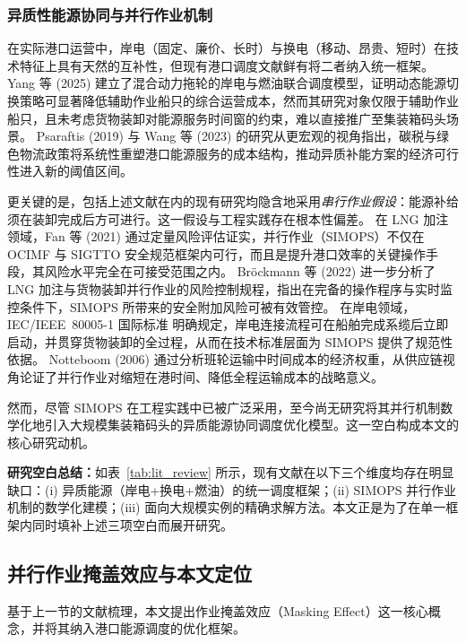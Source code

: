 \documentclass[UTF8, a4paper, 12pt]{ctexart}
\begin{document}
\subsubsection{异质性能源协同与并行作业机制}
 
在实际港口运营中，岸电（固定、廉价、长时）与换电（移动、昂贵、短时）在技术特征上具有天然的互补性，但现有港口调度文献鲜有将二者纳入统一框架。
Yang 等 (2025) \cite{Zhen2022_SP} 建立了混合动力拖轮的岸电与燃油联合调度模型，证明动态能源切换策略可显著降低辅助作业船只的综合运营成本，然而其研究对象仅限于辅助作业船只，且未考虑货物装卸对能源服务时间窗的约束，难以直接推广至集装箱码头场景。
Psaraftis (2019) \cite{Psaraftis2019} 与 Wang 等 (2023) \cite{Wang2023} 的研究从更宏观的视角指出，碳税与绿色物流政策将系统性重塑港口能源服务的成本结构，推动异质补能方案的经济可行性进入新的阈值区间。
 
更关键的是，包括上述文献在内的现有研究均隐含地采用\emph{串行作业假设}：能源补给须在装卸完成后方可进行。这一假设与工程实践存在根本性偏差。
在 LNG 加注领域，Fan 等 (2021) \cite{Fan2021} 通过定量风险评估证实，并行作业（SIMOPS）不仅在 OCIMF 与 SIGTTO 安全规范框架内可行，而且是提升港口效率的关键操作手段，其风险水平完全在可接受范围之内。
Br\"{o}ckmann 等 (2022) \cite{Fan2022_SIMOPS} 进一步分析了 LNG 加注与货物装卸并行作业的风险控制规程，指出在完备的操作程序与实时监控条件下，SIMOPS 所带来的安全附加风险可被有效管控。
在岸电领域，IEC/IEEE~80005-1 国际标准 \cite{IEC80005} 明确规定，岸电连接流程可在船舶完成系缆后立即启动，并贯穿货物装卸的全过程，从而在技术标准层面为 SIMOPS 提供了规范性依据。
Notteboom (2006) \cite{Notteboom2006} 通过分析班轮运输中时间成本的经济权重，从供应链视角论证了并行作业对缩短在港时间、降低全程运输成本的战略意义。
 
然而，尽管 SIMOPS 在工程实践中已被广泛采用，至今尚无研究将其并行机制数学化地引入大规模集装箱码头的异质能源协同调度优化模型。这一空白构成本文的核心研究动机。
 
\textbf{研究空白总结：}如表~\ref{tab:lit_review} 所示，现有文献在以下三个维度均存在明显缺口：(i) 异质能源（岸电+换电+燃油）的统一调度框架；(ii) SIMOPS 并行作业机制的数学化建模；(iii) 面向大规模实例的精确求解方法。本文正是为了在单一框架内同时填补上述三项空白而展开研究。
 
\subsection{并行作业掩盖效应与本文定位}
 
基于上一节的文献梳理，本文提出作业掩盖效应（Masking Effect）这一核心概念，并将其纳入港口能源调度的优化框架。
 
\end{document}
